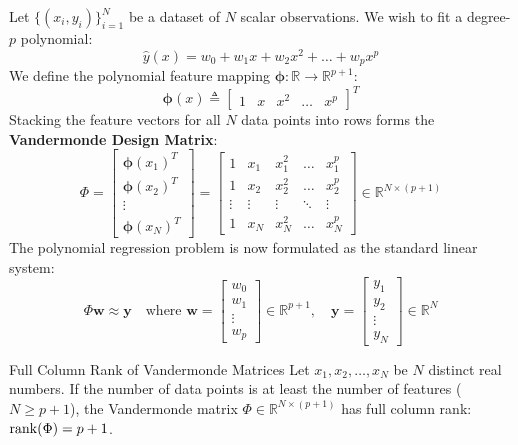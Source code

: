 Let $\{ (x_i, y_i) \}_{i=1}^N$ be a dataset of $N$ scalar observations. We wish to fit a degree-$p$ polynomial:
\begin{equation}
\hat{y}(x) = w_0 + w_1 x + w_2 x^2 + \dots + w_p x^p
\end{equation}
We define the polynomial feature mapping $\boldsymbol{\phi}: \mathbb{R} \to \mathbb{R}^{p+1}$:
\begin{equation}
\boldsymbol{\phi}(x) \triangleq \begin{bmatrix} 1 & x & x^2 & \dots & x^p \end{bmatrix}^T
\end{equation}
Stacking the feature vectors for all $N$ data points into rows forms the \textbf{Vandermonde Design Matrix}:
\begin{equation}
\Phi = \begin{bmatrix}
\boldsymbol{\phi}(x_1)^T \\
\boldsymbol{\phi}(x_2)^T \\
\vdots \\
\boldsymbol{\phi}(x_N)^T
\end{bmatrix} = \begin{bmatrix}
1 & x_1 & x_1^2 & \dots & x_1^p \\
1 & x_2 & x_2^2 & \dots & x_2^p \\
\vdots & \vdots & \vdots & \ddots & \vdots \\
1 & x_N & x_N^2 & \dots & x_N^p
\end{bmatrix} \in \mathbb{R}^{N \times (p+1)}
\label{eq:vandermonde_matrix}
\end{equation}
The polynomial regression problem is now formulated as the standard linear system:
\begin{equation}
\Phi \mathbf{w} \approx \mathbf{y} \quad \text{where } \mathbf{w} = \begin{bmatrix} w_0 \\ w_1 \\ \vdots \\ w_p \end{bmatrix} \in \mathbb{R}^{p+1}, \quad \mathbf{y} = \begin{bmatrix} y_1 \\ y_2 \\ \vdots \\ y_N \end{bmatrix} \in \mathbb{R}^N
\end{equation}

\begin{theorembox}{Full Column Rank of Vandermonde Matrices}
Let $x_1, x_2, \dots, x_N$ be $N$ distinct real numbers. If the number of data points is at least the number of features ($N \ge p + 1$), the Vandermonde matrix $\Phi \in \mathbb{R}^{N \times (p+1)}$ has full column rank: $\operatorname{rank}(\Phi) = p + 1$.
\end{theorembox}


